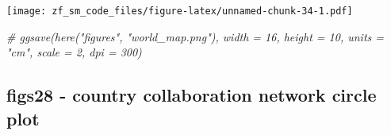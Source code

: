 \documentclass[
]{article}
\newenvironment{Shaded}{\begin{snugshade}}{\end{snugshade}}
\newcommand{\CommentTok}[1]{\textcolor[rgb]{0.56,0.35,0.01}{\textit{#1}}}
\begin{document}
\texttt{[image: zf\_sm\_code\_files/figure-latex/unnamed-chunk-34-1.pdf]}

\begin{Shaded}
\begin{Highlighting}[]
\CommentTok{\# ggsave(here("figures", "world\_map.png"), width = 16, height = 10, units = "cm", scale = 2, dpi = 300)}
\end{Highlighting}
\end{Shaded}

\hypertarget{figs28---country-collaboration-network-circle-plot}{%
\subsection{figs28 - country collaboration network circle
plot}\label{figs28---country-collaboration-network-circle-plot}}
\end{document}

